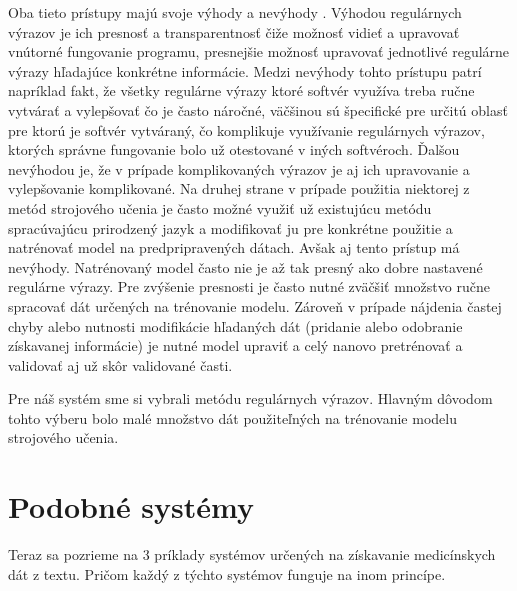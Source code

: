 Oba tieto prístupy majú svoje výhody a nevýhody \cite{nlpAndRegex}. 
Výhodou regulárnych výrazov je ich presnosť a 
transparentnosť čiže možnosť vidieť a upravovať
vnútorné fungovanie programu, presnejšie možnosť 
upravovať jednotlivé regulárne výrazy
hľadajúce konkrétne informácie. Medzi nevýhody tohto prístupu patrí
napríklad fakt, že všetky regulárne výrazy ktoré softvér využíva 
treba ručne vytvárať a vylepšovať
čo je často náročné, väčšinou sú špecifické pre určitú oblasť
pre ktorú je softvér vytváraný, čo komplikuje využívanie
regulárnych výrazov, ktorých správne fungovanie bolo už 
otestované v iných softvéroch. 
Ďalšou nevýhodou je, že v prípade komplikovaných výrazov je aj ich 
upravovanie a vylepšovanie komplikované. 
Na druhej strane v prípade použitia niektorej
z metód strojového učenia je často možné využiť už 
existujúcu metódu spracúvajúcu prirodzený jazyk a
modifikovať ju pre konkrétne použitie a natrénovať
model na predpripravených dátach. Avšak aj tento prístup
má nevýhody. Natrénovaný model často nie je až tak presný 
ako dobre nastavené regulárne výrazy. Pre zvýšenie presnosti je často nutné zväčšiť množstvo ručne spracovať dát určených na trénovanie modelu. Zároveň v prípade nájdenia častej chyby alebo nutnosti modifikácie hľadaných dát (pridanie alebo odobranie získavanej informácie) je nutné model upraviť a celý nanovo pretrénovať a validovať aj už skôr validované časti.

Pre náš systém sme si vybrali metódu regulárnych výrazov. Hlavným dôvodom tohto výberu bolo malé množstvo dát použiteľných na trénovanie modelu strojového učenia. 

\section{Podobné systémy}

Teraz sa pozrieme na 3 príklady systémov určených na získavanie medicínskych dát z textu. Pričom každý z týchto systémov funguje na inom princípe.

